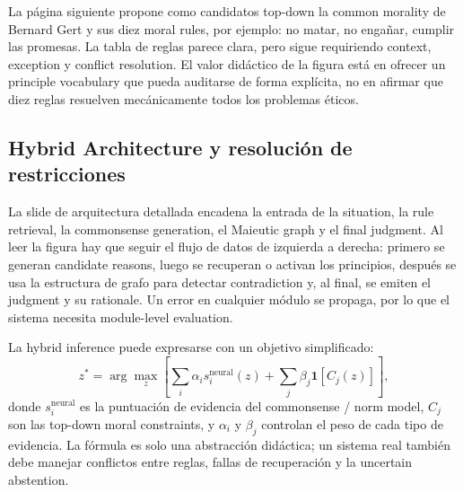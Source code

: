 
La página siguiente propone como candidatos top-down la common morality de Bernard Gert y sus diez moral rules, por ejemplo: no matar, no engañar, cumplir las promesas. La tabla de reglas parece clara, pero sigue requiriendo context, exception y conflict resolution. El valor didáctico de la figura está en ofrecer un principle vocabulary que pueda auditarse de forma explícita, no en afirmar que diez reglas resuelven mecánicamente todos los problemas éticos.


\subsection{Hybrid Architecture y resolución de restricciones}

La slide de arquitectura detallada encadena la entrada de la situation, la rule retrieval, la commonsense generation, el Maieutic graph y el final judgment. Al leer la figura hay que seguir el flujo de datos de izquierda a derecha: primero se generan candidate reasons, luego se recuperan o activan los principios, después se usa la estructura de grafo para detectar contradiction y, al final, se emiten el judgment y su rationale. Un error en cualquier módulo se propaga, por lo que el sistema necesita module-level evaluation.


La hybrid inference puede expresarse con un objetivo simplificado:
\begin{equation}
z^*=\arg\max_z
\left[
\sum_i \alpha_i s_i^{\mathrm{neural}}(z)
+\sum_j \beta_j\mathbf{1}[C_j(z)]
\right],
\end{equation}
donde $s_i^{\mathrm{neural}}$ es la puntuación de evidencia del commonsense / norm model, $C_j$ son las top-down moral constraints, y $\alpha_i$ y $\beta_j$ controlan el peso de cada tipo de evidencia. La fórmula es solo una abstracción didáctica; un sistema real también debe manejar conflictos entre reglas, fallas de recuperación y la uncertain abstention.

